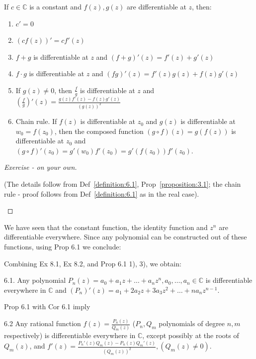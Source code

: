 \begin{proposition}\label{proposition:6.1} If $c \in \mathbb{C}$ is a constant and $f(z), g(z)$ are differentiable at $z$, then:
\begin{enumerate}
    \item $c' = 0$
    \item $(cf(z))' = cf'(z)$
    \item $f + g$ is differentiable at $z$ and $(f + g)'(z) = f'(z) + g'(z)$
    \item $f \cdot g$ is differentiable at $z$ and $(fg)'(z) = f'(z)g(z) + f(z)g'(z)$
    \item If $g(z) \neq 0$, then $\frac{f}{g}$ is differentiable at $z$ and $\left(\frac{f}{g}\right)'(z) = \frac{g(z)f'(z) - f(z)g'(z)}{(g(z))^2}$
    \item Chain rule. If $f(z)$ is differentiable at $z_0$ and $g(z)$ is differentiable at $w_0 = f(z_0)$, then the composed function $(g \circ f)(z) = g(f(z))$ is differentiable at $z_0$ and $(g \circ f)'(z_0) = g'(w_0)f'(z_0) = g'(f(z_0))f'(z_0)$.
\end{enumerate}
\end{proposition}
\begin{proof}[Exercise - on your own]
    
    \begin{exercise}
        (The details follow from Def~\ref{definition:6.1}, Prop~\ref{proposition:3.1}; the chain rule - proof follows from Def~\ref{definition:6.1} as in the real case).
    \end{exercise}
\end{proof}

We have seen that the constant function, the identity function and $z^n$ are differentiable everywhere. Since any polynomial can be constructed out of these functions, using Prop 6.1 we conclude:

Combining Ex 8.1, Ex 8.2, and Prop 6.1 1), 3), we obtain:

\begin{corollary}\label{corollary:6.1}  6.1. Any polynomial $P_n(z) = a_0 + a_1z + \dots + a_nz^n, a_0, \dots, a_n \in \mathbb{C}$ is differentiable everywhere in $\mathbb{C}$ and $(P_n)'(z) = a_1 + 2a_2z + 3a_3z^2 + \dots + na_nz^{n-1}$.
\end{corollary}

Prop 6.1 with Cor 6.1 imply

\begin{corollary} \label{corollary:6.2} 6.2 Any rational function $f(z) = \frac{P_n(z)}{Q_m(z)}$ ($P_n, Q_m$ polynomials of degree $n, m$ respectively) is differentiable everywhere in $\mathbb{C}$, except possibly at the roots of $Q_m(z)$, and $f'(z) = \frac{P_n'(z)Q_m(z) - P_n(z)Q_m'(z)}{(Q_m(z))^2}, (Q_m(z) \neq 0)$.
\end{corollary}

